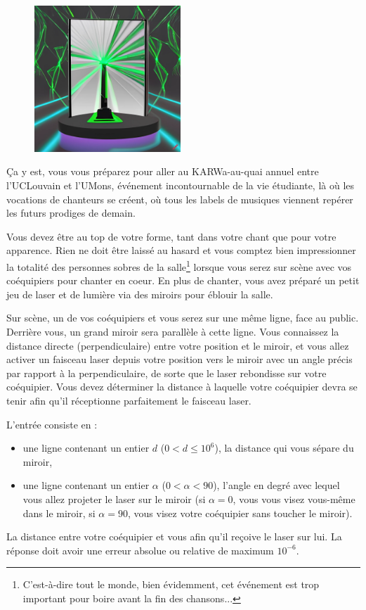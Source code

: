 \problemname{\problemyamlname}

\begin{figure}
    \centering
    \includegraphics[width=5.5cm]{mirror.jpg}
\end{figure}
Ça y est, vous vous préparez pour aller au KARWa-au-quai annuel entre l'UCLouvain et l'UMons, événement incontournable de la vie étudiante, là où les vocations de chanteurs se créent, où tous les labels de musiques viennent repérer les futurs prodiges de demain.

Vous devez être au top de votre forme, tant dans votre chant que pour votre apparence.
Rien ne doit être laissé au hasard et vous comptez bien impressionner la totalité des personnes sobres de la salle\footnote{C'est-à-dire tout le monde, bien évidemment, cet événement est trop important pour boire avant la fin des chansons...} lorsque vous serez sur scène avec vos coéquipiers pour chanter en coeur.
En plus de chanter, vous avez préparé un petit jeu de laser et de lumière via des miroirs pour éblouir la salle.

Sur scène, un de vos coéquipiers et vous serez sur une même ligne, face au public.
Derrière vous, un grand miroir sera parallèle à cette ligne.
Vous connaissez la distance directe (perpendiculaire) entre votre position et le miroir,
et vous allez activer un faisceau laser depuis votre position vers le miroir avec un angle
précis par rapport à la perpendiculaire, de sorte que le laser rebondisse sur votre coéquipier.
Vous devez déterminer la distance à laquelle votre coéquipier devra se tenir afin qu'il réceptionne parfaitement le faisceau laser.

\begin{Input}
	L'entrée consiste en :
	\begin{itemize}
		\item une ligne contenant un entier $d$ ($0 < d \le 10^6$), la distance qui vous sépare du miroir,
		\item une ligne contenant un entier $\alpha$ ($0 < \alpha < 90$), l'angle en degré avec lequel vous allez projeter le laser sur le miroir (si $\alpha=0$, vous vous visez vous-même dans le miroir, si $\alpha=90$, vous visez votre coéquipier sans toucher le miroir).
	\end{itemize}
\end{Input}

\begin{Output}
	La distance entre votre coéquipier et vous afin qu'il reçoive le laser sur lui.
	La réponse doit avoir une erreur absolue ou relative de maximum $10^{-6}$.
\end{Output}
